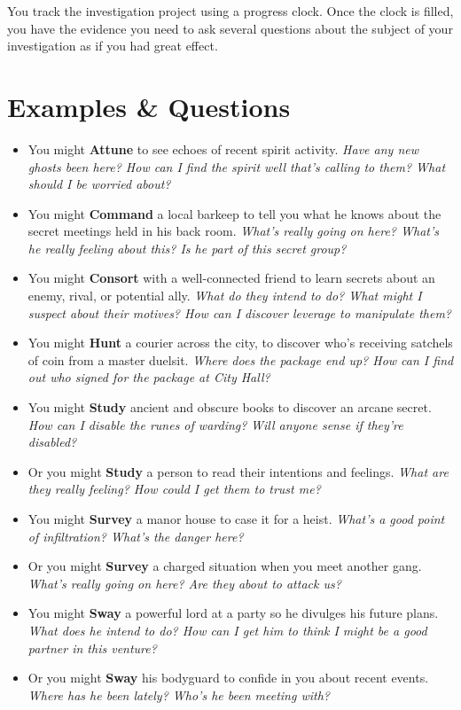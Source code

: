\documentclass[11pt,oneside]{book}
\newcommand{\gameterm}[1]{\textbf{#1}}
\begin{document}
You track the investigation project using a progress clock. Once the clock is filled, you have the evidence you need to ask several questions about the subject of your investigation as if you had great effect.

\section{Examples \& Questions}

\begin{itemize}
	\item You might \gameterm{Attune}  to see echoes of recent spirit activity. \emph{Have any new ghosts been here? How can I find the spirit well that’s calling to them? What should I be worried about?}
	\item You might \gameterm{Command}  a local barkeep to tell you what he knows about the secret meetings held in his back room. \emph{What’s really going on here? What’s he really feeling about this? Is he part of this secret group?}
	\item You might \gameterm{Consort}  with a well-connected friend to learn secrets about an enemy, rival, or potential ally. \emph{What do they intend to do? What might I suspect about their motives? How can I discover leverage to manipulate them?}
	\item You might \gameterm{Hunt}  a courier across the city, to discover who’s receiving satchels of coin from a master duelsit. \emph{Where does the package end up? How can I find out who signed for the package at City Hall?}
	\item You might \gameterm{Study}  ancient and obscure books to discover an arcane secret. \emph{How can I disable the runes of warding? }\emph{Will anyone sense if they’re disabled?}
	\item Or you might \gameterm{Study}  a person to read their intentions and feelings. \emph{What are they really feeling? How could I get them to trust me?}
	\item You might \gameterm{Survey}  a manor house to case it for a heist. \emph{What’s a good point of infiltration? What’s the danger here?}
	\item Or you might \gameterm{Survey}  a charged situation when you meet another gang. \emph{What’s really going on here? Are they about to attack us?}
	\item You might \gameterm{Sway}  a powerful lord at a party so he divulges his future plans. \emph{What does he intend to do? How can I get him to think I might be a good partner in this venture?}
	\item Or you might \gameterm{Sway}  his bodyguard to confide in you about recent events. \emph{Where has he been lately? Who’s he been meeting with?}
\end{itemize}
\end{document}
